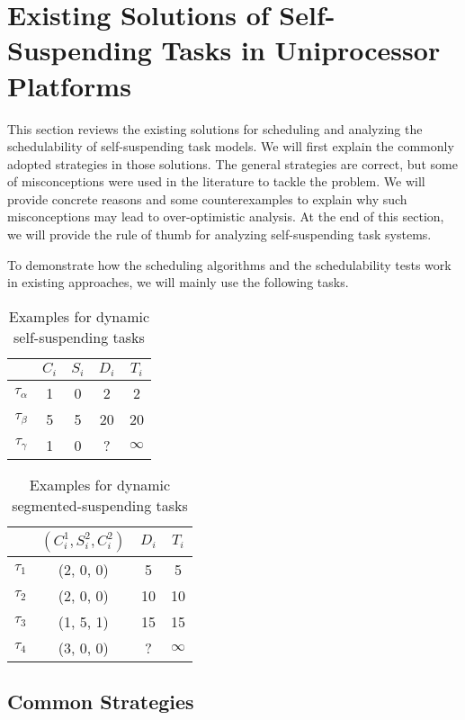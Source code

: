 \section{Existing Solutions of Self-Suspending Tasks in Uniprocessor Platforms}

This section reviews the existing solutions for scheduling and analyzing the schedulability of self-suspending task models. We will first explain the commonly adopted strategies in those solutions. The general strategies are correct, but some of misconceptions were used in the literature to tackle the problem. We will provide concrete reasons and some counterexamples to explain why such misconceptions may lead to over-optimistic analysis. At the end of this section, we will provide the rule of thumb for analyzing self-suspending task systems. 

To demonstrate how the scheduling algorithms and the schedulability tests work in existing approaches, we will mainly use the following tasks. 
\begin{table} 
    \begin{tabular}{|c|c|c|c|c|}
        & $C_i$ &  $S_i$&  $D_i$ & $T_i$\\ 
        \hline
        $\tau_\alpha$ & 1 & 0 &  2 & 2\\ 
        $\tau_\beta$ &  5&  5& 20 & 20 \\ 
        $\tau_\gamma$ & 1 & 0  & ? & $\infty$ \\ 
        \hline
    \end{tabular} 
    \caption{Examples for dynamic self-suspending tasks}
\end{table}

\begin{table} 
    \begin{tabular}{|c|c|c|c|}
        & $(C_i^1, S_i^2, C_i^2)$ &  $D_i$ & $T_i$\\ 
        \hline
        $\tau_1$ & (2, 0, 0) &  5 & 5\\ 
        $\tau_2$ &  (2, 0, 0) & 10 & 10 \\ 
        $\tau_3$ & (1, 5, 1) & 15  & 15\\
        $\tau_4$ & (3, 0, 0) & ? & $\infty$\\
        \hline
    \end{tabular} 
    \caption{Examples for dynamic segmented-suspending tasks}
\end{table}


\subsection{Common Strategies}

